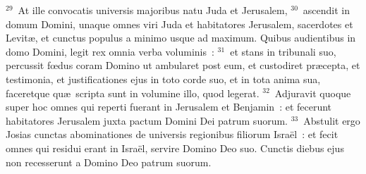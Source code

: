 ${}^{29}$~At ille convocatis universis majoribus natu Juda et Jerusalem,
${}^{30}$~ascendit in domum Domini, unaque omnes viri Juda et habitatores Jerusalem, sacerdotes et Levit\ae , et cunctus populus a minimo usque ad maximum. Quibus audientibus in domo Domini, legit rex omnia verba voluminis~:
${}^{31}$~et stans in tribunali suo, percussit fœdus coram Domino ut ambularet post eum, et custodiret pr\ae cepta, et testimonia, et justificationes ejus in toto corde suo, et in tota anima sua, faceretque qu\ae\ scripta sunt in volumine illo, quod legerat.
${}^{32}$~Adjuravit quoque super hoc omnes qui reperti fuerant in Jerusalem et Benjamin~: et fecerunt habitatores Jerusalem juxta pactum Domini Dei patrum suorum.
${}^{33}$~Abstulit ergo Josias cunctas abominationes de universis regionibus filiorum Isra\"el~: et fecit omnes qui residui erant in Isra\"el, servire Domino Deo suo. Cunctis diebus ejus non recesserunt a Domino Deo patrum suorum.

